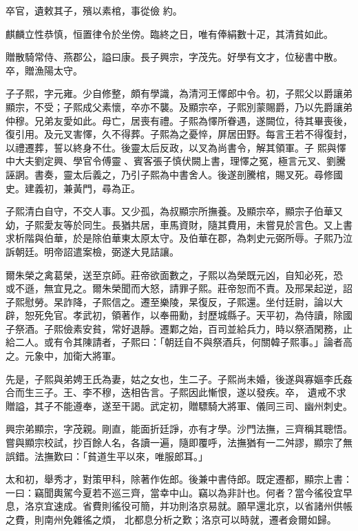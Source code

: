 \begin{pinyinscope}
 卒官，遺敕其子，殯以素棺，事從儉
 約。



 麒麟立性恭慎，恒置律令於坐傍。臨終之日，唯有俸絹數十疋，其清貧如此。



 贈散騎常侍、燕郡公，謚曰康。長子興宗，字茂先。好學有文才，位秘書中散。卒，贈漁陽太守。



 子子熙，字元雍。少自修整，頗有學識，為清河王懌郎中令。初，子熙父以爵讓弟顯宗，不受；子熙成父素懷，卒亦不襲。及顯宗卒，子熙別蒙賜爵，乃以先爵讓弟仲穆。兄弟友愛如此。母亡，居喪有禮。子熙為懌所眷遇，遂闕位，待其畢喪後，復引用。及元叉害懌，久不得葬。子熙為之憂悴，屏居田野。每言王若不得復封，以禮遷葬，誓以終身不仕。後靈太后反政，以叉為尚書令，解其領軍。子
 熙與懌中大夫劉定興、學官令傅靈、賓客張子慎伏闕上書，理懌之冤，極言元叉、劉騰誣誷。書奏，靈太后義之，乃引子熙為中書舍人。後遂剖騰棺，賜叉死。尋修國史。建義初，兼黃門，尋為正。



 子熙清白自守，不交人事。又少孤，為叔顯宗所撫養。及顯宗卒，顯宗子伯華又幼，子熙愛友等於同生。長猶共居，車馬資財，隨其費用，未嘗見於言色。又上書求析階與伯華，於是除伯華東太原太守。及伯華在郡，為刺史元弼所辱。子熙乃泣訴朝廷。明帝詔遣案檢，弼遂大見詰讓。



 爾朱榮之禽葛榮，送至京師。莊帝欲面數之，子熙以為榮既元凶，自知必死，恐
 或不遜，無宜見之。爾朱榮聞而大怒，請罪子熙。莊帝恕而不責。及邢杲起逆，詔子熙慰勞。杲詐降，子熙信之。遷至樂陵，杲復反，子熙還。坐付廷尉，論以大辟，恕死免官。孝武初，領著作，以奉冊勳，封歷城縣子。天平初，為侍讀，除國子祭酒。子熙儉素安貧，常好退靜。遷鄴之始，百司並給兵力，時以祭酒閑務，止給二人。或有令其陳請者，子熙曰：「朝廷自不與祭酒兵，何關韓子熙事。」論者高之。元象中，加衛大將軍。



 先是，子熙與弟娉王氏為妻，姑之女也，生二子。子熙尚未婚，後遂與寡嫗李氏姦合而生三子。王、李不穆，迭相告言。子熙因此慚恨，遂以發疾。卒，
 遺戒不求贈謚，其子不能遵奉，遂至干謁。武定初，贈驃騎大將軍、儀同三司、幽州刺史。



 興宗弟顯宗，字茂親。剛直，能面折廷諍，亦有才學。沙門法撫，三齊稱其聰悟。嘗與顯宗校試，抄百餘人名，各讀一遍，隨即覆呼，法撫猶有一二舛謬，顯宗了無誤錯。法撫歎曰：「貧道生平以來，唯服郎耳。」



 太和初，舉秀才，對策甲科，除著作佐郎。後兼中書侍郎。既定遷都，顯宗上書：一曰：竊聞輿駕今夏若不巡三齊，當幸中山。竊以為非計也。何者？當今徭役宜早息，洛京宜速成。省費則徭役可簡，并功則洛京易就。願早還北京，以省諸州供帳之費，則南州免雜徭之煩，
 北都息分析之歎；洛京可以時就，遷者僉爾如歸。




\end{pinyinscope}
